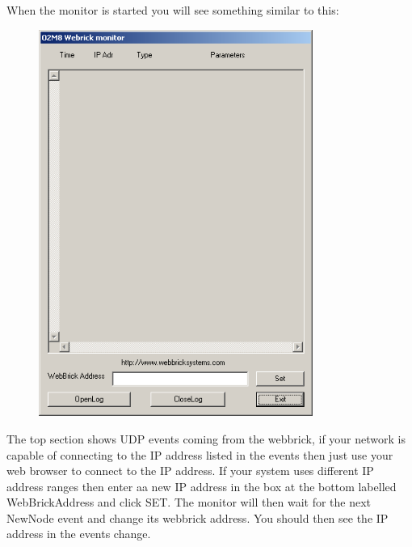 When the monitor is started you will see something similar to this:

\begin{figure}[H]
\centering
\includegraphics[width=0.8\textwidth]{Images/WebBrickMon.png}
\end{figure}

The top section shows UDP events coming from the webbrick, if your network is capable of connecting to the IP
address listed in the events then just use your web browser to connect to the IP address. If your system uses 
different IP address ranges then enter aa new IP address in the box at the bottom labelled WebBrickAddress and
click SET. The monitor will then wait for the next NewNode event and change its webbrick address. You should then
see the IP address in the events change.



